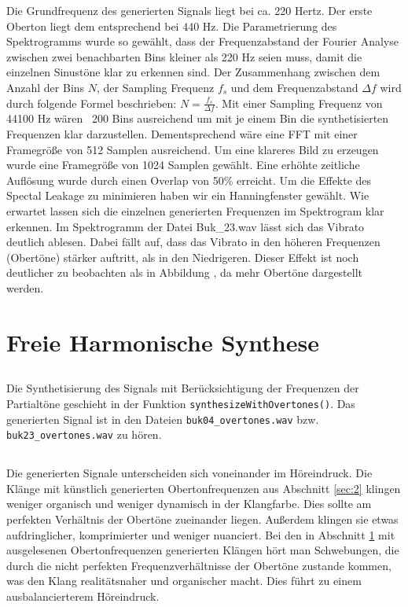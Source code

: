Die Grundfrequenz des generierten Signals liegt bei ca. 220 Hertz. 
Der erste Oberton liegt dem entsprechend bei 440 Hz.
Die Parametrierung des Spektrogramms wurde so gewählt, dass der Frequenzabstand der Fourier Analyse zwischen zwei benachbarten Bins kleiner als 220 Hz seien muss, damit die einzelnen Sinustöne klar zu erkennen sind.
Der Zusammenhang zwischen dem Anzahl der Bins $N$, der Sampling Frequenz $f_s$ und dem Frequenzabstand $\Delta f$ wird durch folgende Formel beschrieben:  $ N = \frac{f_s}{\Delta f}$.
Mit einer Sampling Frequenz von 44100 Hz wären ~200 Bins ausreichend um mit je einem Bin die synthetisierten Frequenzen klar darzustellen.
Dementsprechend wäre eine FFT mit einer Framegröße von 512 Samplen ausreichend.
Um eine klareres Bild zu erzeugen wurde eine Framegröße von 1024 Samplen gewählt.
Eine erhöhte zeitliche Auflösung wurde durch einen Overlap von 50\% erreicht.
Um die Effekte des Spectal Leakage zu minimieren haben wir ein Hanningfenster gewählt.
Wie erwartet lassen sich die einzelnen generierten Frequenzen im Spektrogram klar erkennen.
Im Spektrogramm der Datei Buk\_23.wav lässt sich das Vibrato deutlich ablesen.
Dabei fällt auf, dass das Vibrato in den höheren Frequenzen (Obertöne) stärker auftritt, als in den Niedrigeren.
Dieser Effekt ist noch deutlicher zu beobachten als in Abbildung , da mehr Obertöne dargestellt werden.



\section{Freie Harmonische Synthese}
\label{sec:3}


\subsection{}
Die Synthetisierung des Signals mit Berücksichtigung der Frequenzen der Partialtöne geschieht in der Funktion \texttt{synthesizeWithOvertones()}.
Das generierten Signal ist in den Dateien \texttt{buk04\_overtones.wav} bzw. \texttt{buk23\_overtones.wav} zu hören.


\subsection{}
Die generierten Signale unterscheiden sich voneinander im Höreindruck. 
Die Klänge mit künstlich generierten Obertonfrequenzen aus Abschnitt \ref{sec:2} klingen weniger organisch und weniger dynamisch in der Klangfarbe. 
Dies sollte am perfekten Verhältnis der Obertöne zueinander liegen.
Außerdem klingen sie etwas aufdringlicher, komprimierter und weniger nuanciert.
Bei den in Abschnitt \ref{sec:3} mit ausgelesenen Obertonfrequenzen generierten Klängen hört man Schwebungen, die durch die nicht perfekten Frequenzverhältnisse der Obertöne zustande kommen, was den Klang realitätsnaher und organischer macht.
Dies führt zu einem ausbalancierterem Höreindruck.



